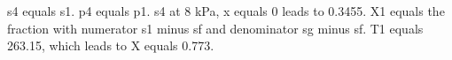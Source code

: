 s4 equals s1.
p4 equals p1.
s4 at 8 kPa, x equals 0 leads to 0.3455.
X1 equals the fraction with numerator s1 minus sf and denominator sg minus sf.
T1 equals 263.15, which leads to X equals 0.773.